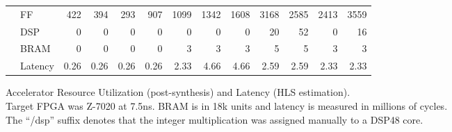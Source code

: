 \begin{figure}[htb!]
{\begin{tabular}{cl rrrr rrrrrrr}
&FF	& 422 & 394 & 293 & 907 & 1099&1342 &1608 &3168 &2585&2413& 3559 \\
&DSP	& 0   & 0   & 0   & 0   & 0   & 0   & 0   & 20  &52  &0   & 16   \\
&BRAM	& 0   & 0   & 0   & 0   & 3   & 3   & 3   & 5   & 5  &3   & 3    \\
&Latency& 0.26& 0.26& 0.26& 0.26& 2.33& 4.66& 4.66& 2.59&2.59&2.33& 2.33 \\
\bottomrule
\end{tabular}
}
\caption{Accelerator Resource Utilization (post-synthesis) and Latency (HLS estimation).\\
Target FPGA was Z-7020 at 7.5ns. BRAM is in 18k units and latency is measured in millions of cycles.\\
The ``/dsp'' suffix denotes that the integer multiplication was assigned manually to a DSP48 core.}
\label{tab:acc-util}
\end{figure}

